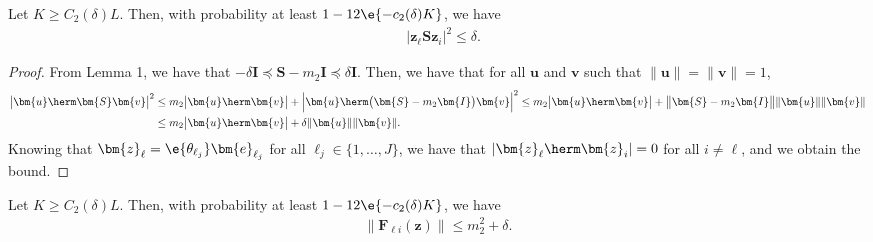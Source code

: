\begin{cor} \label{cor:ziSzj} 
Let $K\geq C_2(\delta)L$. Then, with probability at least $1-12\e{-c_2(\delta)K}$, we have
\begin{align}
	&\big|\bm{z}_{\ell}\bm{S}\bm{z}_i\big|^2\leq\delta\nonumber.
\end{align}	
\end{cor}
\begin{proof}
From Lemma 1, we have that $-\delta\bm{I}\preceq\bm{S}-m_2\bm{I}\preceq\delta\bm{I}$. 
Then, we have that for all $\bm{u}$ and $\bm{v}$ such that $\|\bm{u}\|=\|\bm{v}\|=1$,	
\begin{align}
	\big|\bm{u}\herm\bm{S}\bm{v}\big|^2&
	\leq m_2\big|\bm{u}\herm\bm{v}\big| +\Big|\bm{u}\herm\big(\bm{S}-m_2\bm{I}\big)\bm{v}\Big|^2
	\leq m_2\big|\bm{u}\herm\bm{v}\big| +\big\|\bm{S}-m_2\bm{I}\big\|\|\bm{u}\|\|\bm{v}\|
			\nonumber\\&
	\leq m_2\big|\bm{u}\herm\bm{v}\big| +\delta\|\bm{u}\|\|\bm{v}\|.\nonumber
\end{align}
Knowing that $\bm{z}_{\ell}=\e{\theta_{\ell_j}}\bm{e}_{\ell_j}$ for all ${\ell}_j\in\{1,\ldots,J\}$, we have that $|\bm{z}_{\ell}\herm\bm{z}_i|=0$ for all $i\neq {\ell}$, and we obtain the bound.
\end{proof}

\begin{cor} \label{cor:normFji} 
Let $K\geq C_2(\delta)L$. Then, with probability at least $1-12\e{-c_2(\delta)K}$, we have
\begin{align}
	\big\|\bm{F}_{{\ell}i}(\bm{z})\big\|\leq m_2^2+\delta\nonumber.
\end{align}	
\end{cor}

